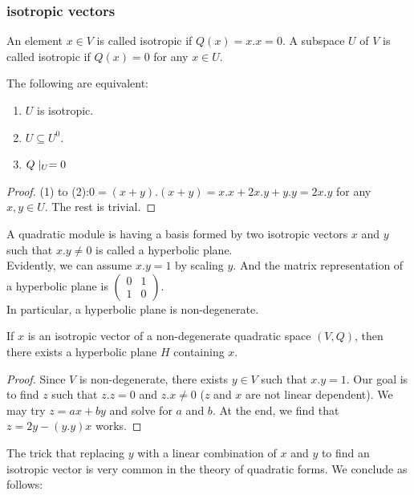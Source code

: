 \documentclass[15pt]{scrartcl}
\begin{document}
\subsubsection*{isotropic vectors}
\begin{definition}
    An element $x\in V$ is called isotropic if $Q(x)=x.x=0$. A subspace $U$ of $V$ is called isotropic if $Q(x)=0$ for any $x\in U$. 
\end{definition}
\begin{lemma}
    The following are equivalent:
    \begin{enumerate}
        \item $U$ is isotropic. 
        \item $U\subseteq U^0$.
        \item $Q\mid_{U}=0$
    \end{enumerate}
\end{lemma}
\begin{proof}
    (1) to (2):$0=(x+y).(x+y)=x.x+2x.y+y.y=2x.y$ for any $x,y\in U$. The rest is trivial. 
\end{proof}
\begin{definition}
    A quadratic module is having a basis formed by two isotropic vectors $x$ and $y$ such that $x.y\neq 0$ is called a hyperbolic plane. 
    \\

    Evidently, we can assume $x.y=1$ by scaling $y$. And the matrix representation of a hyperbolic plane is $\begin{pmatrix}
        0 & 1
        \\
        1 & 0
    \end{pmatrix}$.
    \\

    In particular, a hyperbolic plane is non-degenerate. 
\end{definition}
\begin{theorem}
    If $x$ is an isotropic vector of a non-degenerate quadratic space $(V,Q)$, then there exists a hyperbolic plane $H$ containing $x$. 
\end{theorem}
\begin{proof}
    Since $V$ is non-degenerate, there exists $y\in V$ such that $x.y=1$. Our goal is to find $z$ such that $z.z=0$ and $z.x\neq 0 $ ($z$ and $x$ are not linear dependent). We may try $z=ax+by$ and solve for $a$ and $b$. At the end, we find that $z=2y-(y.y)x$ works.
\end{proof}
The trick that replacing $y$ with a linear combination of $x$ and $y$ to find an isotropic vector is very common in the theory of quadratic forms. We conclude as follows:
\end{document}
